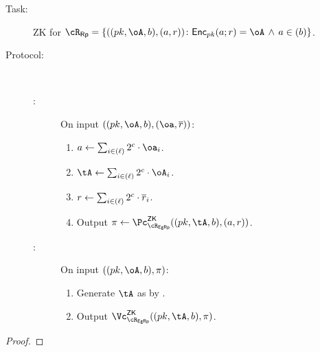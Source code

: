 \begin{description}
\begin{description}
	\item[Task:] ZK for $\rRp =\rRpDef$.
	
	\item[Protocol:]~
	
	\begin{description}
	\item[\Pc:] On input $((\pk,\oA,b),(\oa,\orr))$:
	
	\begin{enumerate}
			\item   $a \asn  \sum_{i\in (\ell)}   2^c \cdot \oa_i$. 
		\item    $\tA \asn  \sum_{i\in (\ell)}    2^c \cdot \oA_i$. 
		\item    $r \leftarrow  \sum_{i\in (\ell)}  2^c \cdot \overline{r}_i$. 
        
        \item  Output $\pi \asn \pZK{\rEgRp}((\pk,\tA,b), (a,r))$.
        
	\end{enumerate}
	
	
\item[\Vc:] On input $((\pk,\oA,b),\pi)$:
	
	\begin{enumerate}
		\item   Generate $\tA$ as by \Pc.
		\item  Output $\vZK{\rEgRp}((\pk,\tA,b), \pi)$.
		
	\end{enumerate}
	
\end{description}
\end{description}

		\begin{proof}
		\end{proof}
\end{description}
